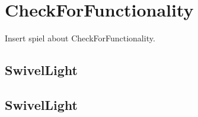

\chapter{CheckForFunctionality}
Insert spiel about CheckForFunctionality.

\section{SwivelLight}


\section{SwivelLight}

